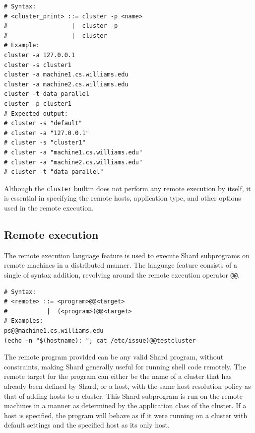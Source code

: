 \documentclass[oneside]{report}
\begin{document}
\begin{minipage}[c]{\textwidth-15pt}
  \begin{lstlisting}[language=Shard]
# Syntax:
# <cluster_print> ::= cluster -p <name>
#                  |  cluster -p
#                  |  cluster
# Example:
cluster -a 127.0.0.1
cluster -s cluster1
cluster -a machine1.cs.williams.edu
cluster -a machine2.cs.williams.edu
cluster -t data_parallel
cluster -p cluster1
# Expected output:
# cluster -s "default"
# cluster -a "127.0.0.1"
# cluster -s "cluster1"
# cluster -a "machine1.cs.williams.edu"
# cluster -a "machine2.cs.williams.edu"
# cluster -t "data_parallel"
\end{lstlisting}
  \smallskip
\end{minipage}

Although the \texttt{cluster} builtin does not perform any remote execution by itself, it is essential in specifying the remote hosts, application type, and other options used in the remote execution.

\subsection{Remote execution}
The remote execution language feature is used to execute Shard subprograms on remote machines in a distributed manner.
The language feature consists of a single of syntax addition, revolving around the remote execution operator \texttt{@@}.

\begin{minipage}[c]{\textwidth-15pt}
  \begin{lstlisting}[language=Shard]
# Syntax:
# <remote> ::= <program>@@<target>
#           |  (<program>)@@<target>
# Examples:
ps@@machine1.cs.williams.edu
(echo -n "$(hostname): "; cat /etc/issue)@@testcluster
\end{lstlisting}
  \smallskip
\end{minipage}

The remote program provided can be any valid Shard program, without constraints, making Shard generally useful for running shell code remotely.
The remote target for the program can either be the name of a cluster that has already been defined by Shard, or a host, with the same host resolution policy as that of adding hosts to a cluster.
This Shard subprogram is run on the remote machines in a manner as determined by the application class of the cluster.
If a host is specified, the program will behave as if it were running on a cluster with default settings and the specified host as its only host.
\end{document}
